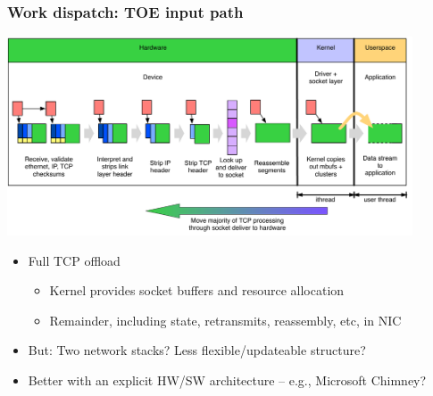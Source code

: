 \begin{frame}
  \frametitle{Work dispatch: TOE input path}

  \begin{center}
    \includegraphics[width=0.9\textwidth]{../../figures/network-dispatch-toe.pdf}
  \end{center}

  \vspace{-0.5cm}
  \pause

  \begin{small}
  \begin{itemize}
    \item Full TCP offload
    \begin{itemize}
      \item Kernel provides socket buffers and resource allocation
      \item Remainder, including state, retransmits, reassembly, etc, in NIC
    \end{itemize}

    \smallskip
    \pause

    \item But: Two network stacks?  Less flexible/updateable structure?
    \item Better with an explicit HW/SW architecture -- e.g., Microsoft Chimney?
  \end{itemize}
  \end{small}
\end{frame}

%

%
%

